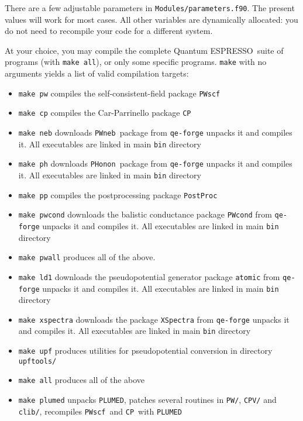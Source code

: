 \documentclass[12pt,a4paper]{article}
\def\qe{{\sc Quantum ESPRESSO}}
\def\PWscf{\texttt{PWscf}}
\def\PHonon{\texttt{PHonon}}
\def\CP{\texttt{CP}}
\def\PostProc{\texttt{PostProc}}
\def\NEB{\texttt{PWneb}} %
\begin{document}
There are a few adjustable parameters in \texttt{Modules/parameters.f90}. 
The
present values will work for most cases. All other variables are dynamically
allocated: you do not need to recompile your code for a different system.
    
At your choice, you may compile the complete \qe\ suite of programs 
(with \texttt{make all}), or only some specific programs. \texttt{make} with no arguments yields a list of valid compilation targets:
\begin{itemize}
\item \texttt{make pw}  compiles the self-consistent-field package \PWscf
\item \texttt{make cp}  compiles the Car-Parrinello package \CP
\item \texttt{make neb} downloads \NEB\ package from \texttt{qe-forge}
			unpacks it and compiles it. All executables are linked
			in main \texttt{bin} directory
\item \texttt{make ph}  downloads \PHonon\ package from \texttt{qe-forge}
			unpacks it and compiles it. All executables are linked
			in main \texttt{bin} directory
\item \texttt{make pp}  compiles the postprocessing package \PostProc
\item \texttt{make pwcond} downloads the balistic conductance package \texttt{PWcond}
			from \texttt{qe-forge}
			unpacks it and compiles it. All executables are linked
			in main \texttt{bin} directory
\item \texttt{make pwall} produces all of the above.
\item \texttt{make ld1}  downloads the pseudopotential generator package \texttt{atomic} 
			from \texttt{qe-forge}
			unpacks it and compiles it. All executables are linked
			in main \texttt{bin} directory
\item \texttt{make xspectra} downloads the package \texttt{XSpectra} 
			from \texttt{qe-forge}
			unpacks it and compiles it. All executables are linked
			in main \texttt{bin} directory
\item \texttt{make upf} produces utilities for pseudopotential conversion in
                        directory \texttt{upftools/}
\item \texttt{make all} produces all of the above
\item \texttt{make plumed} unpacks \texttt{PLUMED}, patches several routines
                           in \texttt{PW/}, \texttt{CPV/} and \texttt{clib/},
                           recompiles \PWscf\ and \CP\ with \texttt{PLUMED}

\end{itemize}
\end{document}
